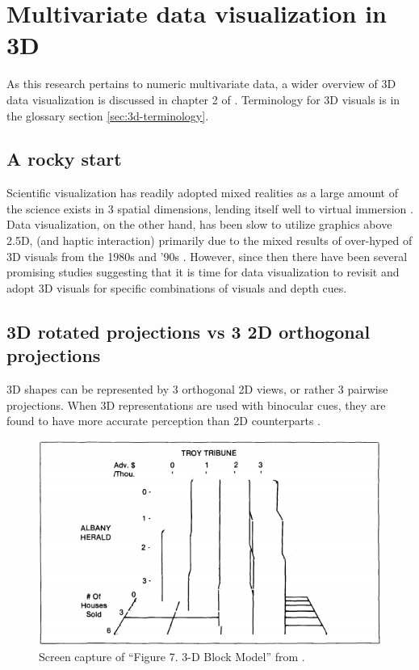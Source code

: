 \documentclass{monashthesis}
\begin{document}
\section{Multivariate data visualization in 3D}\label{sec:3d}

As this research pertains to numeric multivariate data, a wider overview
of 3D data visualization is discussed in chapter 2 of
\textcite{marriott_immersive_2018}. Terminology for 3D visuals is in the
glossary section \ref{sec:3d-terminology}.

\subsection{A rocky start}\label{a-rocky-start}

Scientific visualization has readily adopted mixed realities as a large
amount of the science exists in 3 spatial dimensions, lending itself
well to virtual immersion \autocite{marriott_immersive_2018}. Data
visualization, on the other hand, has been slow to utilize graphics
above 2.5D, (and haptic interaction) primarily due to the mixed results
of over-hyped of 3D visuals from the 1980s and '90s
\autocite{munzner_visualization_2014}. However, since then there have
been several promising studies suggesting that it is time for data
visualization to revisit and adopt 3D visuals for specific combinations
of visuals and depth cues.

\subsection{3D rotated projections vs 3 2D orthogonal
projections}\label{d-rotated-projections-vs-3-2d-orthogonal-projections}

3D shapes can be represented by 3 orthogonal 2D views, or rather 3
pairwise projections. When 3D representations are used with binocular
cues, they are found to have more accurate perception than 2D
counterparts \autocite[depicted in figure
\ref{fig:lee86fig}]{lee_effects_1986}.




\begin{figure}

{\centering \includegraphics[width=0.7\linewidth]{./figures/lee86fig} 

}

\caption{Screen capture of ``Figure 7. 3-D Block Model'' from
\textcite{lee_effects_1986}.}\label{fig:lee86fig}
\end{figure}
\end{document}
